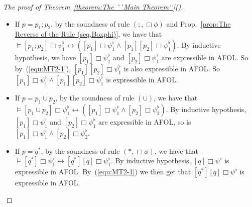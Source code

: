 \documentclass{fcs}
\newcommand{\rmn}[1]{(\romannumeral#1)}
\DeclareMathOperator{\seq}{;}
\begin{document}
\begin{proof}[The proof of Theorem~\ref{theorem:The ``Main Theorem''}\rmn{1}]
\begin{itemize}
\item If $p=p_1\seq p_2$, by the soundness of rule $(\seq, \Box\phi)$ and Prop.~\ref{prop:The Reverse of the Rule (seq,Boxphi)}, we have that $\models [p_1\seq p_2]\Box\psi^\flat_1\leftrightarrow ([p_1]\Box\psi^\flat_1\wedge [p_1][p_2]\Box\psi^\flat_1)$.
By inductive hypothesis, we have $[p_1]\Box\psi^\flat_1$ and $[p_2]\Box\psi^\flat_1$ are expressible in AFOL. So by~(\ref{equ:MT2-1}), $[p_1][p_2]\Box\psi^\flat_1$ is also expressible in AFOL.
So $[p_1]\Box\psi^\flat_1\wedge [p_1][p_2]\Box\psi^\flat_1$ is expressible in AFOL.

\item If $p = p_1\cup p_2$, by the soundness of rule $(\cup)$, we have that $\models [p_1\cup p_2]\Box\psi^\flat_1\leftrightarrow ([p_1]\Box\psi^\flat_1\wedge [p_2]\Box\psi^\flat_2)$.
By inductive hypothesis, $[p_1]\Box\psi^\flat_1$ and $[p_2]\Box\psi^\flat_1$ are expressible in AFOL, so is $[p_1]\Box\psi^\flat_1\wedge [p_2]\Box\psi^\flat_2$.

\item If $p=q^*$, by the soundness of rule $(*, \Box\phi)$, we have that $\models [q^*]\Box\psi^\flat_1\leftrightarrow [q^*][q]\Box\psi^\flat_1$.
By inductive hypothesis, $[q]\Box\psi^\flat$ is expressible in AFOL.
By~(\ref{equ:MT2-1}) we then get that $[q^*][q]\Box\psi^\flat$ is expressible in AFOL.
\end{itemize}
\end{proof}
\end{document}
